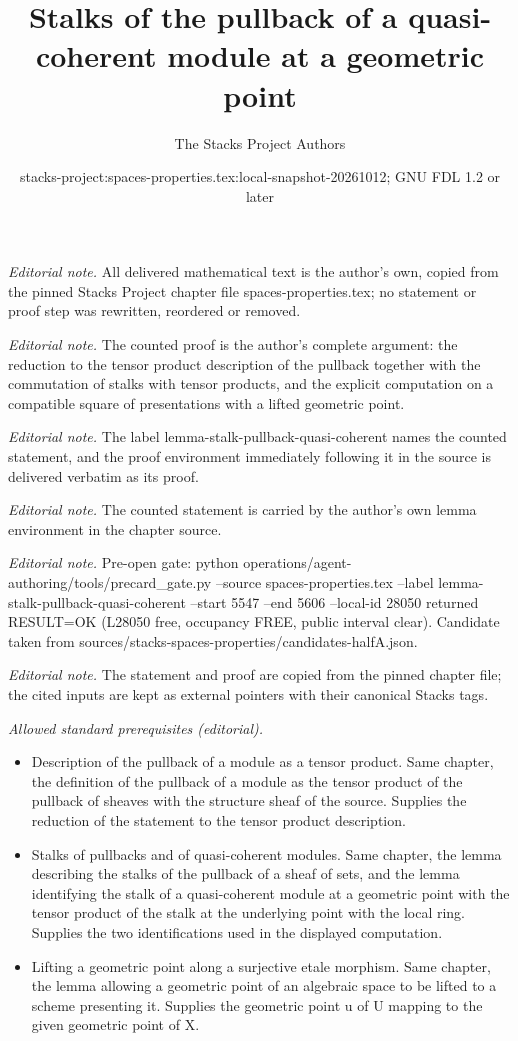 \documentclass[10pt,a4paper]{amsart}
\title{Stalks of the pullback of a quasi-coherent module at a geometric point}
\author{The Stacks Project Authors}
\date{stacks-project:spaces-properties.tex:local-snapshot-20261012; GNU FDL 1.2 or later}
\theoremstyle{plain}
\theoremstyle{definition}
\theoremstyle{remark}
\numberwithin{equation}{subsection}
\begin{document}
\maketitle
\noindent\textit{Editorial note.} All delivered mathematical text is the author's own, copied from the pinned Stacks Project chapter file spaces-properties.tex; no statement or proof step was rewritten, reordered or removed.\par\medskip
\noindent\textit{Editorial note.} The counted proof is the author's complete argument: the reduction to the tensor product description of the pullback together with the commutation of stalks with tensor products, and the explicit computation on a compatible square of presentations with a lifted geometric point.\par\medskip
\noindent\textit{Editorial note.} The label lemma-stalk-pullback-quasi-coherent names the counted statement, and the proof environment immediately following it in the source is delivered verbatim as its proof.\par\medskip
\noindent\textit{Editorial note.} The counted statement is carried by the author's own lemma environment in the chapter source.\par\medskip
\noindent\textit{Editorial note.} Pre-open gate: python operations/agent-authoring/tools/precard\_gate.py --source spaces-properties.tex --label lemma-stalk-pullback-quasi-coherent --start 5547 --end 5606 --local-id 28050 returned RESULT=OK (L28050 free, occupancy FREE, public interval clear). Candidate taken from sources/stacks-spaces-properties/candidates-halfA.json.\par\medskip
\noindent\textit{Editorial note.} The statement and proof are copied from the pinned chapter file; the cited inputs are kept as external pointers with their canonical Stacks tags.\par\medskip
\noindent\textit{Allowed standard prerequisites (editorial).}\begin{itemize}
\item Description of the pullback of a module as a tensor product. Same chapter, the definition of the pullback of a module as the tensor product of the pullback of sheaves with the structure sheaf of the source. Supplies the reduction of the statement to the tensor product description.
\item Stalks of pullbacks and of quasi-coherent modules. Same chapter, the lemma describing the stalks of the pullback of a sheaf of sets, and the lemma identifying the stalk of a quasi-coherent module at a geometric point with the tensor product of the stalk at the underlying point with the local ring. Supplies the two identifications used in the displayed computation.
\item Lifting a geometric point along a surjective etale morphism. Same chapter, the lemma allowing a geometric point of an algebraic space to be lifted to a scheme presenting it. Supplies the geometric point u of U mapping to the given geometric point of X.
\end{itemize}\medskip
\end{document}
